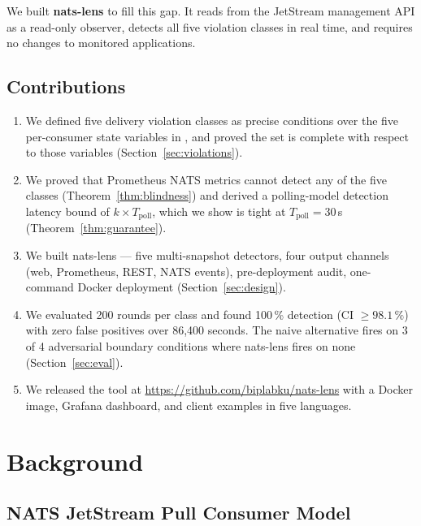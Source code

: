 \documentclass[journal]{IEEEtran}
\begin{document}
We built \textbf{nats-lens} to fill this gap. It reads from the JetStream
management API as a read-only observer, detects all five violation classes
in real time, and requires no changes to monitored applications.

\subsection*{Contributions}

\begin{enumerate}
\item We defined five delivery violation classes as precise conditions
  over the five per-consumer state variables in ,
  and proved the set is complete with respect to those variables
  (Section~\ref{sec:violations}).
\item We proved that Prometheus NATS metrics cannot detect any of the five
  classes (Theorem~\ref{thm:blindness}) and derived a polling-model
  detection latency bound of $k \times T_\text{poll}$, which we
  show is tight at $T_\text{poll}{=}30$\,s (Theorem~\ref{thm:guarantee}).
\item We built nats-lens --- five multi-snapshot detectors, four output
  channels (web, Prometheus, REST, NATS events), pre-deployment audit,
  one-command Docker deployment (Section~\ref{sec:design}).
\item We evaluated 200 rounds per class and found 100\,\% detection
  (CI $\geq 98.1\,\%$) with zero false positives over 86,400 seconds.
  The naive alternative fires on 3 of 4 adversarial boundary conditions
  where nats-lens fires on none (Section~\ref{sec:eval}).
\item We released the tool at \url{https://github.com/biplabku/nats-lens}
  with a Docker image, Grafana dashboard, and client examples in five
  languages.
\end{enumerate}

\section{Background}
\label{sec:background}

\subsection{NATS JetStream Pull Consumer Model}
\end{document}
